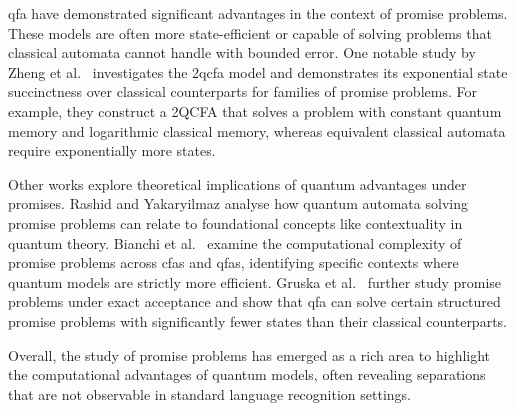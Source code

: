 \gls{qfa} have demonstrated significant advantages in the context of promise problems. These models are often more state-efficient or capable of solving problems that classical automata cannot handle with bounded error. One notable study by Zheng et al.\ \cite{zheng2013state} investigates the \gls{2qcfa} model and demonstrates its exponential state succinctness over classical counterparts for families of promise problems. For example, they construct a 2QCFA that solves a problem with constant quantum memory and logarithmic classical memory, whereas equivalent classical automata require exponentially more states.

Other works explore theoretical implications of quantum advantages under promises. Rashid and Yakaryilmaz \cite{rashid2014implications} analyse how quantum automata solving promise problems can relate to foundational concepts like contextuality in quantum theory. Bianchi et al.\ \cite{bianchi2014complexity} examine the computational complexity of promise problems across \glspl{cfa} and \glspl{qfa}, identifying specific contexts where quantum models are strictly more efficient. Gruska et al.\ \cite{gruska2015potential} further study promise problems under exact acceptance and show that \gls{qfa} can solve certain structured promise problems with significantly fewer states than their classical counterparts. 

Overall, the study of promise problems has emerged as a rich area to highlight the computational advantages of quantum models, often revealing separations that are not observable in standard language recognition settings.